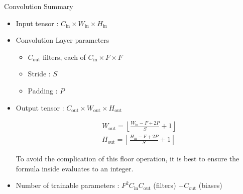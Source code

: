 \begin{frame}[allowframebreaks]

\begin{myconceptblock}{5.7}{Convolution Summary}
    \begin{itemize}
        \item Input tensor : $C_{\text {in}} \times W_{\text {in}} \times H_{\text {in}}$
        \item
        Convolution Layer parameters

        \begin{itemize}
            \item $C_{\text {out}}$ filters, each of $C_{\text {in}} \times F \times F$
            \item Stride : $S$
            \item Padding : $P$
        \end{itemize}
        \item
        Output tensor : $C_{\text {out}} \times W_{\text {out}} \times H_{\text {out}}$

        $$
        \begin{aligned}
        & W_{\text{out}}=\left\lfloor\frac{W_{\text{in}}-F+2 P}{S}+1\right\rfloor \\
        & H_{\text{out}}=\left\lfloor\frac{H_{\text{in}}-F+2 P}{S}+1\right\rfloor
        \end{aligned}
        $$

        To avoid the complication of this floor operation, it is best to ensure the formula inside evaluates to an integer.
        \item Number of trainable parameters : $F^2 C_{\text{in}} C_{\text{out}}$ (filters) $+ C_{\text{out}}$ (biases)
    \end{itemize}
\end{myconceptblock}

\end{frame}

